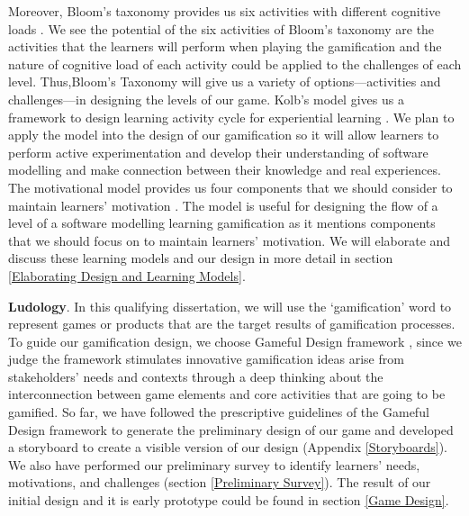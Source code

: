 \documentclass[12pt, a4paper]{report}
\begin{document}
{Moreover, Bloom's taxonomy provides us six activities with different cognitive loads \cite{krathwohl2002revision}. We see the potential of the six activities of Bloom’s taxonomy are the activities that the learners will perform when playing the gamification and the nature of cognitive load of each activity could be applied to the challenges of each level. Thus,Bloom's Taxonomy will give us a variety of options---activities and challenges---in designing the levels of our game. Kolb's model gives us a framework to design learning activity cycle for experiential learning \cite{kolb2014experiential}. We plan to apply the model into the design of our gamification so it will allow learners to perform active experimentation and develop their understanding of software modelling and make connection between their knowledge and real experiences. The motivational model provides us four components that we should consider to maintain learners' motivation \cite{keller2010motivational}. The model is useful for designing the flow of a level of a software modelling learning gamification as it mentions components that we should focus on to maintain learners' motivation. We will elaborate and discuss these learning models and our design in more detail in section \ref{Elaborating Design and Learning Models}. 

\textbf{Ludology}. In this qualifying dissertation, we will use the `gamification' word to represent games or products that are the target results of gamification processes. To guide our gamification design, we choose Gameful Design framework \cite{deterding2015lens}, since we judge the framework stimulates innovative gamification ideas arise from stakeholders' needs and contexts through a deep thinking about the interconnection between game elements and core activities that are going to be gamified. So far, we have followed the prescriptive guidelines of the Gameful Design framework to generate the preliminary design of our game and developed a storyboard to create a visible version of our design (Appendix \ref{Storyboards}). We also have performed our preliminary survey to identify learners' needs, motivations, and challenges (section \ref{Preliminary Survey}). The result of our initial design and it is early prototype could be found in section \ref{Game Design}.

}
\end{document}
